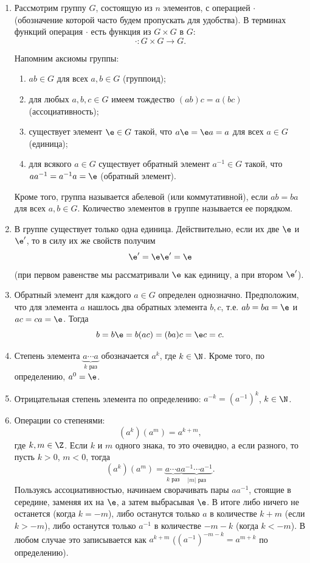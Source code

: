 \begin{enumerate}
\item Рассмотрим группу $G$, состоящую из $n$ элементов, с операцией $\cdot$ (обозначение которой часто будем пропускать для удобства). В терминах функций операция $\cdot$ есть функция из $G\times G$ в $G$:
$$
\cdot: G\times G\to G.
$$

Напомним аксиомы группы:
\begin{enumerate}[G1]
\item $ab\in G$ для всех $a,b\in G$ (группоид);
\item для любых $a,b,c\in G$ имеем тождество $(ab)c=a(bc)$ (ассоциативность);
\item существует элемент $\e\in G$ такой, что $a\e=\e a=a$ для всех $a\in G$ (единица);
\item для всякого $a\in G$ существует обратный элемент $a^{-1}\in G$ такой, что $aa^{-1}=a^{-1}a=\e$ (обратный элемент).
\end{enumerate}
Кроме того, группа называется абелевой (или коммутативной), если $ab=ba$ для всех $a,b\in G$. Количество элементов в группе называется ее порядком.
\item В группе существует только одна единица. Действительно, если их две $\e$ и $\e'$, то в силу их же свойств получим
$$
\e' = \e\e' = \e
$$
(при первом равенстве мы рассматривали $\e$ как единицу, а при втором $\e'$).
\item Обратный элемент для каждого $a\in G$ определен однозначно. Предположим, что для элемента $a$ нашлось два обратных элемента $b,c$, т.е. $ab=ba=\e$ и $ac=ca=\e$. Тогда
$$
b=b\e=b(ac)=(ba)c=\e c=c.
$$
\item Степень элемента $\underbrace{a\cdots a}_{k\mbox{ раз}}$ обозначается $a^k$, где $k\in\N$. Кроме того, по определению, $a^0=\e$.
\item Отрицательная степень элемента по определению: $a^{-k}=(a^{-1})^k$, $k\in\N$.
\item Операции со степенями:
$$
(a^k)(a^m)=a^{k+m},
$$
где $k,m\in \Z$. Если $k$ и $m$ одного знака, то это очевидно, а если разного, то пусть $k>0$, $m<0$, тогда
$$
(a^k)(a^m) = \underbrace{a\cdots a}_{k\mbox{ раз}}\underbrace{a^{-1}\cdots a^{-1}}_{|m|\mbox{ раз}}.
$$
Пользуясь ассоциативностью, начинаем сворачивать пары $aa^{-1}$, стоящие в середине, заменяя их на $\e$, а затем выбрасывая $\e$. В итоге либо ничего не останется (когда $k=-m$), либо останутся только $a$ в количестве $k+m$ (если $k>-m$), либо останутся только $a^{-1}$ в количестве $-m-k$ (когда $k<-m$). В любом случае это записывается как $a^{k+m}$ ($(a^{-1})^{-m-k}=a^{m+k}$ по определению).


\end{enumerate}
